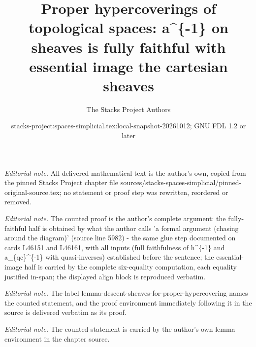 \documentclass{stacks-project}
\title{Proper hypercoverings of topological spaces: a\textasciicircum{}\{-1\} on sheaves is fully faithful with essential image the cartesian sheaves}
\author{The Stacks Project Authors}
\date{stacks-project:spaces-simplicial.tex:local-snapshot-20261012; GNU FDL 1.2 or later}
\theoremstyle{plain}
\theoremstyle{definition}
\theoremstyle{remark}
\numberwithin{equation}{subsection}
\begin{document}
\maketitle
\noindent\textit{Editorial note.} All delivered mathematical text is the author's own, copied from the pinned Stacks Project chapter file sources/stacks-spaces-simplicial/pinned-original-source.tex; no statement or proof step was rewritten, reordered or removed.\par\medskip
\noindent\textit{Editorial note.} The counted proof is the author's complete argument: the fully-faithful half is obtained by what the author calls 'a formal argument (chasing around the diagram)' (source line 5982) - the same glue step documented on cards L46151 and L46161, with all inputs (full faithfulness of h\textasciicircum{}\{-1\} and a\_\{qc\}\textasciicircum{}\{-1\} with quasi-inverses) established before the sentence; the essential-image half is carried by the complete six-equality computation, each equality justified in-span; the displayed align block is reproduced verbatim.\par\medskip
\noindent\textit{Editorial note.} The label lemma-descent-sheaves-for-proper-hypercovering names the counted statement, and the proof environment immediately following it in the source is delivered verbatim as its proof.\par\medskip
\noindent\textit{Editorial note.} The counted statement is carried by the author's own lemma environment in the chapter source.\par\medskip
\end{document}
